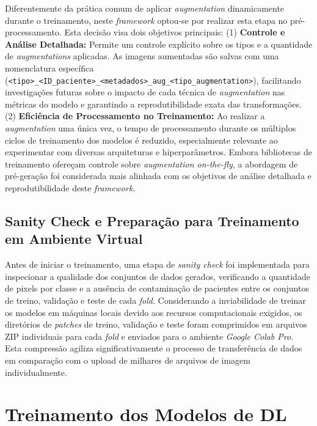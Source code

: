 Diferentemente da prática comum de aplicar \textit{augmentation} dinamicamente durante o treinamento, neste \textit{framework} optou-se por realizar esta etapa no pré-processamento. Esta decisão visa dois objetivos principais: (1) \textbf{Controle e Análise Detalhada:} Permite um controle explícito sobre os tipos e a quantidade de \textit{augmentations} aplicadas. As imagens aumentadas são salvas com uma nomenclatura específica (\texttt{<tipo>\_<ID\_paciente>\_<metadados>\_aug\_<tipo\_augmentation>}), facilitando investigações futuras sobre o impacto de cada técnica de \textit{augmentation} nas métricas do modelo e garantindo a reprodutibilidade exata das transformações. (2) \textbf{Eficiência de Processamento no Treinamento:} Ao realizar a \textit{augmentation} uma única vez, o tempo de processamento durante os múltiplos ciclos de treinamento dos modelos é reduzido, especialmente relevante ao experimentar com diversas arquiteturas e hiperparâmetros. Embora bibliotecas de treinamento ofereçam controle sobre \textit{augmentation on-the-fly}, a abordagem de pré-geração foi considerada mais alinhada com os objetivos de análise detalhada e reprodutibilidade deste \textit{framework}.

\subsection{Sanity Check e Preparação para Treinamento em Ambiente Virtual}\label{subsec:met_sanity_zip}
Antes de iniciar o treinamento, uma etapa de \textit{sanity check} foi implementada para inspecionar a qualidade dos conjuntos de dados gerados, verificando a quantidade de pixels por classe e a ausência de contaminação de pacientes entre os conjuntos de treino, validação e teste de cada \textit{fold}.
Considerando a inviabilidade de treinar os modelos em máquinas locais devido aos recursos computacionais exigidos, os diretórios de \textit{patches} de treino, validação e teste foram comprimidos em arquivos ZIP individuais para cada \textit{fold} e enviados para o ambiente \textit{Google Colab Pro}. Esta compressão agiliza significativamente o processo de transferência de dados em comparação com o upload de milhares de arquivos de imagem individualmente.

\section{Treinamento dos Modelos de DL}\label{sec:met_treinamento_dl}

